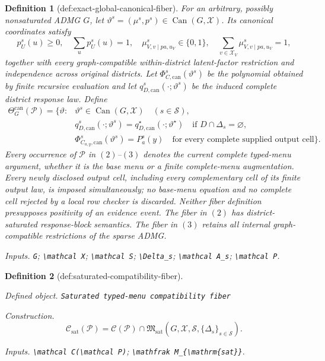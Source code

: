 \documentclass{article}
\newtheorem{definition}{Definition}
\begin{document}
\begin{definition}[def:exact-global-canonical-fiber]
For an arbitrary, possibly nonsaturated ADMG \(G\), let \(\vartheta^s=(\mu^s,p^s)\in\operatorname{Can}(G,\mathcal X)\).  Its canonical coordinates satisfy
\[
p_U^s(u)\geq0,\quad\sum_up_U^s(u)=1,
\quad \mu_{V,v\mid pa,u_V}^s\in\{0,1\},
\quad \sum_{v\in\mathcal X_V}\mu_{V,v\mid pa,u_V}^s=1,
\]
together with every graph-compatible within-district latent-factor restriction and independence across original districts.  Let \(\Phi_{C,\mathrm{can}}^s(\vartheta^s)\) be the polynomial obtained by finite recursive evaluation and let \(q_{D,\mathrm{can}}^s(\cdot;\vartheta^s)\) be the induced complete district response law.  Define
\[
\begin{split}
\Theta_G^{\mathrm{can}}(\mathcal P)=\bigl\{\vartheta:{}&
\vartheta^s\in\operatorname{Can}(G,\mathcal X)
\quad(s\in\mathcal S),\\
&q_{D,\mathrm{can}}^s(\cdot;\vartheta^s)
=q_{D,\mathrm{can}}^\star(\cdot;\vartheta^\star)
\quad\text{if }D\cap\Delta_s=\varnothing,\\
&\Phi_{C_{a,y},\mathrm{can}}^s(\vartheta^s)=P_a^s(y)
\quad\text{for every complete supplied output cell}\bigr\}.
\end{split}
\tag{3}
\]
Every occurrence of \(\mathcal P\) in \((2)\)--\((3)\) denotes the current complete typed-menu argument, whether it is the base menu or a finite complete-menu augmentation.  Every newly disclosed output cell, including every complementary cell of its finite output law, is imposed simultaneously; no base-menu equation and no complete cell rejected by a local row checker is discarded.  Neither fiber definition presupposes positivity of an evidence event.  The fiber in \((2)\) has district-saturated response-block semantics.  The fiber in \((3)\) retains all internal graph-compatible restrictions of the sparse ADMG.
\par\smallskip\noindent\emph{Inputs.} \texttt{G}; \texttt{\textbackslash{}\allowbreak{}mathcal X}; \texttt{\textbackslash{}\allowbreak{}mathcal S}; \texttt{\textbackslash{}\allowbreak{}Delta\_\allowbreak{}s}; \texttt{\textbackslash{}\allowbreak{}mathcal A\_\allowbreak{}s}; \texttt{\textbackslash{}\allowbreak{}mathcal P}.
\end{definition}

\begin{definition}[def:saturated-compatibility-fiber]\label{def:saturated-compatibility-fiber}
\par\smallskip\noindent\emph{Defined object.} \texttt{Saturated typed-\allowbreak{}menu compatibility fiber}
\par\smallskip\noindent\emph{Construction.} \[
\mathcal C_{\mathrm{sat}}(\mathcal P)=\mathcal C(\mathcal P)\cap\mathfrak M_{\mathrm{sat}}(G,\mathcal X,\mathcal S,\{\Delta_s\}_{s\in\mathcal S}).
\]
\par\smallskip\noindent\emph{Inputs.} \texttt{\textbackslash{}\allowbreak{}mathcal C(\textbackslash{}\allowbreak{}mathcal P)}; \texttt{\textbackslash{}\allowbreak{}mathfrak M\_\allowbreak{}\{\textbackslash{}\allowbreak{}mathrm\{sat\}\allowbreak{}\}\allowbreak{}}.
\end{definition}
\end{document}
